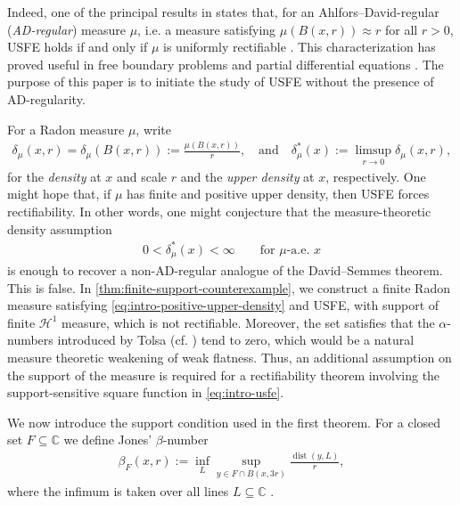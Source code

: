 \documentclass[11pt,a4paper,english,reqno]{amsart}
\newcommand{\hd}[1]{\mathcal{H}^{#1}}
\numberwithin{equation}{section}
\newcommand{\CC}[0]{\mathbb{C}}
\renewcommand{\subset}{\subseteq}
\DeclareMathOperator{\dist}{dist}
\numberwithin{definition}{section}
\begin{document}
Indeed, one of the principal results in \cite{davidAnalysisUniformlyRectifiable1993} states that, for an Ahlfors--David-regular (\emph{AD-regular}) measure $μ$, i.e. a measure satisfying $μ(B(x,r))\approx r$ for all $r>0$, USFE holds if and only if $\mu$ is uniformly rectifiable \cite[Theorem I.2.41]{davidAnalysisUniformlyRectifiable1993}.
This characterization has proved useful in free boundary problems and partial differential equations \cite{hofmannUniformRectifiabilityHarmonic2014b,hofmannUniformRectifiabilityHarmonic2014c}.
The purpose of this paper is to initiate the study of USFE without the presence of AD-regularity.

For a Radon measure $\mu$, write
\begin{align}\label{eq:intro-density-notation}
  \delta_\mu(x,r)=\delta_\mu(B(x,r)):=\frac{\mu(B(x,r))}{r},
  \quad\text{and}\quad
  \delta_\mu^*(x):=\limsup_{r\to0}\delta_\mu(x,r),
\end{align}
for the \emph{density} at $x$ and scale $r$ and the \emph{upper density} at $x$, respectively.
One might hope that, if $\mu$ has finite and positive upper density, then USFE forces rectifiability.
In other words, one might conjecture that the measure-theoretic density assumption
\begin{align}\label{eq:intro-positive-upper-density}
  0<\delta_\mu^*(x)<\infty
  \qquad\text{for }\mu\text{-a.e. }x
\end{align}
is enough to recover a non-AD-regular analogue of the David--Semmes theorem.  This is false.  In \cref{thm:finite-support-counterexample}, we construct a finite Radon measure satisfying \cref{eq:intro-positive-upper-density} and USFE, with support of finite $\hd1$ measure, which is not rectifiable.
Moreover, the set satisfies that the $\alpha$-numbers introduced by Tolsa (cf. \cite{tolsaUniformRectifiabilityCalderon2009}) tend to zero, which would be a natural measure theoretic weakening of weak flatness.
Thus, an additional assumption on the support of the measure is required for a rectifiability theorem involving the support-sensitive square function in \cref{eq:intro-usfe}.

We now introduce the support condition used in the first theorem.
For a closed set $F\subset\CC$ we define Jones' $β$-number
\begin{align}\label{eq:intro-beta-number}
  \beta_F(x,r)
  :=
  \inf_L \sup_{y\in F\cap B(x,3r)}\frac{\dist(y,L)}{r},
\end{align}
where the infimum is taken over all lines $L\subset\CC$ \cite{jonesRectifiableSetsTraveling1990}.
\end{document}
